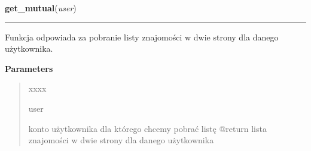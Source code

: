 \hspace{.8\funcindent}\begin{boxedminipage}{\funcwidth}

    \raggedright \textbf{get\_mutual}(\textit{user})

    \vspace{-1.5ex}

    \rule{\textwidth}{0.5\fboxrule}
\setlength{\parskip}{2ex}
    Funkcja odpowiada za pobranie listy znajomości w dwie strony dla danego
    użytkownika.

\setlength{\parskip}{1ex}
      \textbf{Parameters}
      \vspace{-1ex}

      \begin{quote}
        \begin{Ventry}{xxxx}

          \item[user]

          konto użytkownika dla którego chcemy pobrać listę @return lista 
          znajomości w dwie strony dla danego użytkownika

        \end{Ventry}

      \end{quote}

    \end{boxedminipage}

